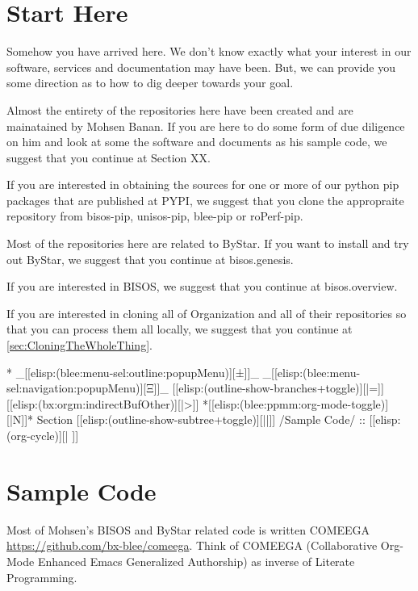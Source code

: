 \section{Start Here}

Somehow you have arrived here. We don't know exactly what your
interest in our software, services and documentation may have been.
But, we can provide you some direction as to how to dig deeper towards
your goal.

Almost the entirety of the repositories here have been created and are
mainatained by Mohsen Banan. If you are here to do some form of due
diligence on him and look at some the software and documents as his
sample code, we suggest that you continue at Section XX.

If you are interested in obtaining the sources for one or more of our
python pip packages that are published at PYPI, we suggest that you
clone the appropraite repository from bisos-pip, unisos-pip, blee-pip
or roPerf-pip.

Most of the repositories here are related to ByStar. If you want to
install and try out ByStar, we suggest that you continue at bisos.genesis.

If you are interested in BISOS, we suggest that you continue at bisos.overview.

If you are interested in cloning all of Organization and all of their
repositories so that you can process them all locally, we suggest that you continue at
\ref{sec:CloningTheWholeThing}.


\begin{whenOrg}
*  _[[elisp:(blee:menu-sel:outline:popupMenu)][±]]_ _[[elisp:(blee:menu-sel:navigation:popupMenu)][Ξ]]_ [[elisp:(outline-show-branches+toggle)][|=]] [[elisp:(bx:orgm:indirectBufOther)][|>]] *[[elisp:(blee:ppmm:org-mode-toggle)][|N]]*  Section    [[elisp:(outline-show-subtree+toggle)][||]]   /Sample Code/ ::  [[elisp:(org-cycle)][| ]]
\end{whenOrg}

\section{Sample Code}

Most of Mohsen's BISOS and ByStar related code is written COMEEGA
\url{https://github.com/bx-blee/comeega}. Think of COMEEGA
(Collaborative Org-Mode Enhanced Emacs Generalized Authorship) as
inverse of Literate Programming.

